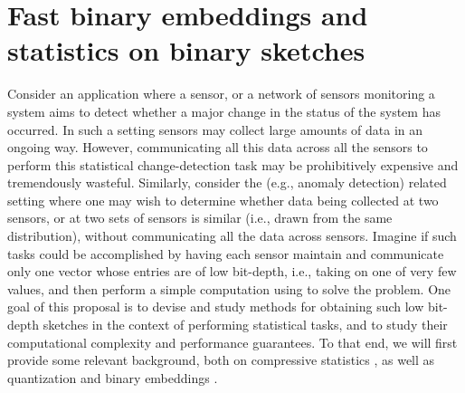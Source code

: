 \section{Fast binary embeddings and  statistics on binary sketches}

Consider an application where a sensor, or a network of sensors monitoring a system aims to detect whether a major change in the status of the system has occurred. In such a setting sensors may collect large amounts of data in an ongoing way. However, communicating all this data across all the sensors to perform this statistical change-detection task may be prohibitively expensive and tremendously wasteful. Similarly, consider the (e.g., anomaly detection) related setting where one may wish to determine whether data being collected at two sensors, or at two sets of sensors is similar (i.e., drawn from the same distribution), without communicating all the data across sensors. Imagine if such tasks could be accomplished by having each sensor maintain and communicate only one vector whose entries are of low bit-depth, i.e., taking on one of very few values, and then perform a simple computation using to solve the problem. One goal of this proposal is to devise and study methods for obtaining such low bit-depth sketches in the context of performing statistical tasks, and to study their computational complexity and  performance guarantees. To that end, we will first provide some relevant background, both on compressive statistics \cite{gribonval2017compressive, } , as well as quantization and binary embeddings \cite{jacques2013robust,SaabIEEEIT,saab2018quantization,huynh2018fast}.




